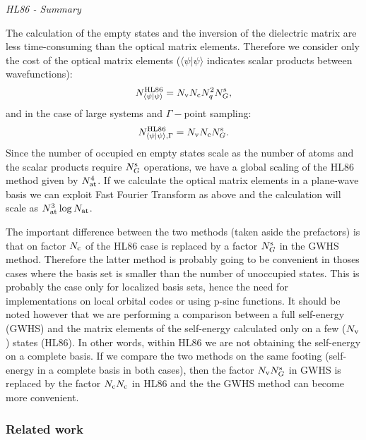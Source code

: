 \documentclass[12pt]{article}
\begin{document}
\noindent
{\it HL86 - Summary} 

\noindent
The calculation of the empty states and the inversion of the dielectric matrix are
less time-consuming than the optical matrix elements. Therefore we consider only the
cost of the optical matrix elements ($\langle\psi|\psi\rangle$ 
indicates scalar products between wavefunctions):
  \begin{equation}
  N_{\langle\psi|\psi\rangle}^{\rm HL86} = N_{\rm v} N_{\rm c} N_q^2 N_G^{\rm s},
  \end{equation}
and in the case of large systems and $\Gamma-$point sampling:
  \begin{equation}
  N_{\langle\psi|\psi\rangle,\Gamma}^{\rm HL86} = N_{\rm v} N_{\rm c} N_G^{\rm s}.
  \end{equation}
Since the number of occupied en empty states scale as the number of atoms and
the scalar products require $N_G^{\rm s}$ operations, we have a global scaling of
the HL86 method given by $N_{\rm at}^4$. If we calculate the optical matrix elements
in a plane-wave basis we can exploit Fast Fourier Transform as above and the
calculation will scale as $N_{\rm at}^3\log N_{\rm at}$.

The important difference between the two methods (taken aside the prefactors)
is that on factor $N_{\rm c}$ of the HL86 case is replaced by a factor $N_G^{\rm s}$
in the GWHS method. Therefore the latter method is probably going to be convenient
in thoses cases where the basis set is smaller than the number of unoccupied states.
This is probably the case only for localized basis sets, hence the need for implementations
on local orbital codes or using p-sinc functions.
It should be noted however that we are performing a comparison between a full
self-energy (GWHS) and the matrix elements of the self-energy calculated only
on a few ($N_{\rm v}$) states (HL86). In other words, within HL86 we are not obtaining
the self-energy on a complete basis. If we compare the two methods on the same
footing (self-energy in a complete basis in both cases), then the factor $N_{\rm v} N_G^{\rm s}$
in GWHS is replaced by the factor $N_{\rm c} N_{\rm c}$ in HL86 and the the GWHS
method can become more convenient.

\subsubsection*{Related work}
\end{document}
